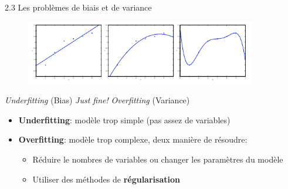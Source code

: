 \begin{frame}{2.3 Les problèmes de biais et de variance}
  \begin{figure}
    \includegraphics[width=0.9\textwidth]{figs/theProblemOfOverfitting.png}
  \end{figure}
  \footnotesize
  \vspace{-1cm}
  \begin{center}
    \textit{Underfitting} (Bias) \hspace{1.5cm} \textit{Just fine!} \hspace{1.5cm} \textit{Overfitting} (Variance)
  \end{center}
  \begin{itemize}
  \item \textbf{Underfitting}: modèle trop simple (pas assez de variables)
  \item \textbf{Overfitting}: modèle trop complexe, deux manière de résoudre:
    \begin{itemize}
    \item Réduire le nombres de variables ou changer les paramètres du modèle
    \item Utiliser des méthodes de \textbf{régularisation}
    \end{itemize}
  \end{itemize}  
\end{frame}

